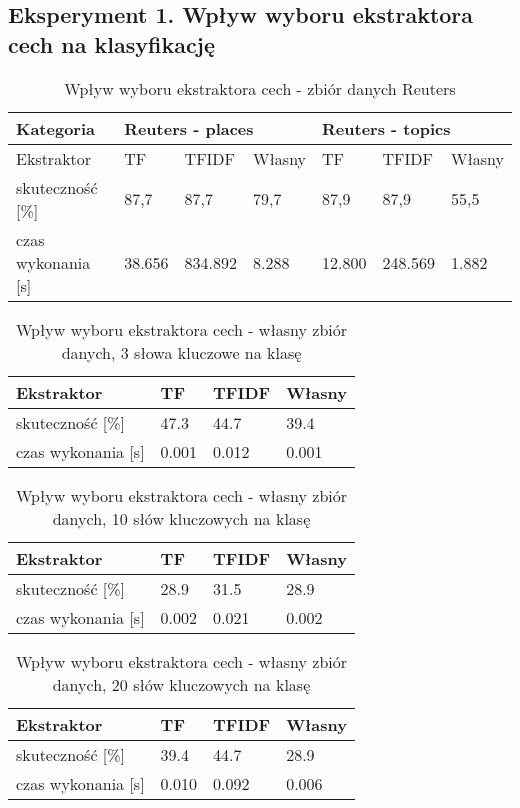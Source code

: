 \documentclass{classrep}
\begin{document}
\subsection{Eksperyment 1. Wpływ wyboru ekstraktora cech na klasyfikację}
\begin{table}[h]
	\caption{Wpływ wyboru ekstraktora cech - zbiór danych Reuters}
	\begin{tabular}{l|l|l|l|l|l|l}
		Kategoria& \multicolumn{3}{|l}{ Reuters - places} 	& \multicolumn{3}{|l}{ Reuters - topics}\\
		\hline
		Ekstraktor& TF & TFIDF & Własny & TF & TFIDF & Własny\\
		\hline
		skuteczność [\%]   &87,7&87,7&79,7&87,9&87,9&55,5\\
		czas wykonania [s] &38.656&834.892&8.288&12.800&248.569&1.882\\
	\end{tabular}
\end{table}
\begin{table}[h]
	\centering
	\caption{Wpływ wyboru ekstraktora cech - własny zbiór danych, 3 słowa kluczowe na klasę}
	\begin{tabular}{l|l|l|l}
		Ekstraktor& TF & TFIDF & Własny\\
		\hline
		skuteczność [\%]   &47.3&44.7&39.4\\
		czas wykonania [s] &0.001&0.012&0.001\\
	\end{tabular}
\end{table}
\begin{table}[h]
	\centering
\caption{Wpływ wyboru ekstraktora cech - własny zbiór danych, 10 słów kluczowych na klasę}
	\begin{tabular}{l|l|l|l}
		Ekstraktor& TF & TFIDF & Własny\\
		\hline
		skuteczność [\%]   &28.9&31.5&28.9\\
		czas wykonania [s] &0.002&0.021&0.002\\
	\end{tabular}
\end{table}
\begin{table}[h]
	\centering
	\caption{Wpływ wyboru ekstraktora cech - własny zbiór danych, 20 słów kluczowych na klasę}
	\begin{tabular}{l|l|l|l}
		Ekstraktor& TF & TFIDF & Własny\\
		\hline
		skuteczność [\%]   &39.4&44.7&28.9\\
		czas wykonania [s] &0.010&0.092&0.006\\
	\end{tabular}
\end{table}
\newpage
\end{document}
